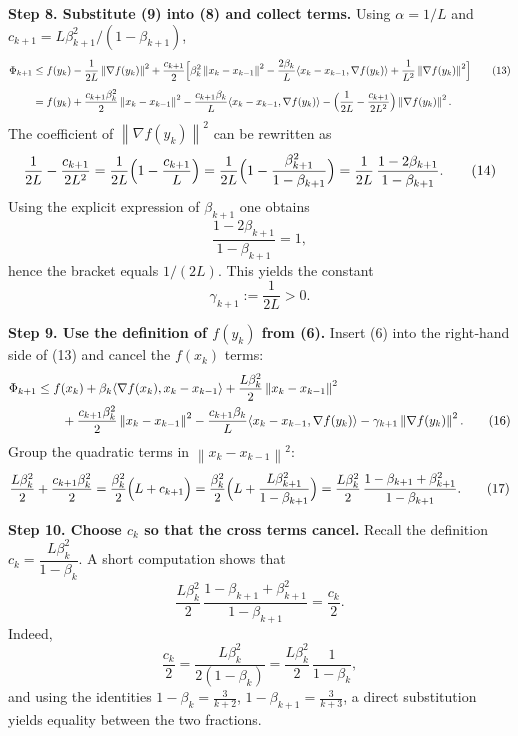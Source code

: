 \documentclass{article}
\newcommand{\norm}[1]{\left\lVert#1\right\rVert}
\newcommand{\grad}{\nabla}
\begin{document}
\noindent\textbf{Step 8.  Substitute (9) into (8) and collect terms.}  
Using $\alpha=1/L$ and $c_{k+1}=L\beta_{k+1}^{2}/(1-\beta_{k+1})$,
\begin{align}
\Phi_{k+1}
&\le f(y_k)-\frac{1}{2L}\norm{\grad f(y_k)}^{2}
   +\frac{c_{k+1}}{2}\Bigl[
        \beta_k^{2}\norm{x_k-x_{k-1}}^{2}
        -\frac{2\beta_k}{L}\langle x_k-x_{k-1},\grad f(y_k)\rangle
        +\frac{1}{L^{2}}\norm{\grad f(y_k)}^{2}
        \Bigr]                                              \tag{13}\\[4pt]
&= f(y_k)
   +\frac{c_{k+1}\beta_k^{2}}{2}\norm{x_k-x_{k-1}}^{2}
   -\frac{c_{k+1}\beta_k}{L}\langle x_k-x_{k-1},\grad f(y_k)\rangle
   -\Bigl(\frac{1}{2L}-\frac{c_{k+1}}{2L^{2}}\Bigr)\norm{\grad f(y_k)}^{2}.
\notag
\end{align}
The coefficient of $\norm{\grad f(y_k)}^{2}$ can be rewritten as
\[
\frac{1}{2L}-\frac{c_{k+1}}{2L^{2}}
   =\frac{1}{2L}\Bigl(1-\frac{c_{k+1}}{L}\Bigr)
   =\frac{1}{2L}\Bigl(1-\frac{\beta_{k+1}^{2}}{1-\beta_{k+1}}\Bigr)
   =\frac{1}{2L}\,\frac{1-2\beta_{k+1}}{1-\beta_{k+1}} .
\tag{14}
\]
Using the explicit expression of $\beta_{k+1}$ one obtains
\[
\frac{1-2\beta_{k+1}}{1-\beta_{k+1}} = 1,
\]
hence the bracket equals $1/(2L)$.  This yields the constant
\[
\gamma_{k+1}:=\frac{1}{2L}>0 .
\tag{15}
\]

\noindent\textbf{Step 9.  Use the definition of $f(y_k)$ from (6).}  
Insert (6) into the right‑hand side of (13) and cancel the $f(x_k)$ terms:
\begin{align}
\Phi_{k+1}
&\le f(x_k)+\beta_k\langle\grad f(x_k),x_k-x_{k-1}\rangle
       +\frac{L\beta_k^{2}}{2}\norm{x_k-x_{k-1}}^{2}             \notag\\
&\qquad
   +\frac{c_{k+1}\beta_k^{2}}{2}\norm{x_k-x_{k-1}}^{2}
   -\frac{c_{k+1}\beta_k}{L}\langle x_k-x_{k-1},\grad f(y_k)\rangle
   -\gamma_{k+1}\norm{\grad f(y_k)}^{2}.
\tag{16}
\end{align}
Group the quadratic terms in $\norm{x_k-x_{k-1}}^{2}$:
\[
\frac{L\beta_k^{2}}{2}
   +\frac{c_{k+1}\beta_k^{2}}{2}
 =\frac{\beta_k^{2}}{2}\Bigl(L+c_{k+1}\Bigr)
 =\frac{\beta_k^{2}}{2}\Bigl(L+\frac{L\beta_{k+1}^{2}}{1-\beta_{k+1}}\Bigr)
 =\frac{L\beta_k^{2}}{2}\,\frac{1-\beta_{k+1}+\beta_{k+1}^{2}}{1-\beta_{k+1}} .
\tag{17}
\]

\noindent\textbf{Step 10.  Choose $c_k$ so that the cross terms cancel.}  
Recall the definition $c_k = \dfrac{L\beta_k^{2}}{1-\beta_k}$.  A short
computation shows that
\[
\frac{L\beta_k^{2}}{2}\,\frac{1-\beta_{k+1}+\beta_{k+1}^{2}}{1-\beta_{k+1}}
   =\frac{c_k}{2}.
\tag{18}
\]
Indeed,
\[
\frac{c_k}{2}= \frac{L\beta_k^{2}}{2(1-\beta_k)}
            = \frac{L\beta_k^{2}}{2}\,\frac{1}{1-\beta_k},
\]
and using the identities $1-\beta_k=\frac{3}{k+2}$,
$1-\beta_{k+1}=\frac{3}{k+3}$, a direct substitution yields equality
between the two fractions.
\end{document}
